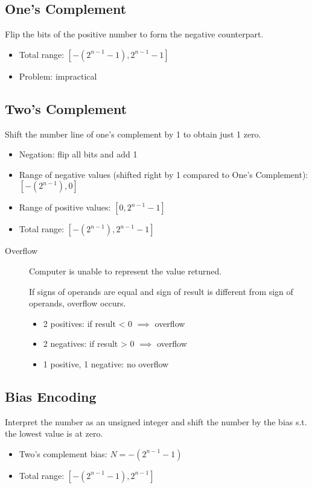 \subsection{One's Complement}
Flip the bits of the positive number to form the negative counterpart.
\begin{itemize}
	\item Total range: \([-(2^{n-1}-1), 2^{n-1}-1]\)
	\item Problem: impractical
\end{itemize}

\subsection{Two's Complement} 
Shift the number line of one's complement by 1 to obtain just 1 zero.
\begin{itemize}
	\item Negation: flip all bits and add 1
	\item Range of negative values (shifted right by 1 compared to One's Complement): \([-(2^{n-1}), 0]\)
	\item Range of positive values: \([0, 2^{n-1}-1]\)
	\item Total range: \([-(2^{n-1}), 2^{n-1}-1]\)
\end{itemize}

\begin{description}
	\item[Overflow] Computer is unable to represent the value returned.
	
	If signs of operands are equal and sign of result is different from sign of operands, overflow occurs. 
	\begin{itemize}
	    \item 2 positives: if result < 0 \(\implies\) overflow
	    \item 2 negatives: if result > 0 \(\implies\) overflow
	    \item 1 positive, 1 negative: no overflow
	\end{itemize}
\end{description}

\subsection{Bias Encoding}
Interpret the number as an unsigned integer and shift the number by the bias s.t. the lowest value is at zero.
\begin{itemize}
    \item Two's complement bias: \(N = -(2^{n-1}-1)\)
    \item Total range: \([-(2^{n-1}-1), 2^{n-1}]\)
\end{itemize}

